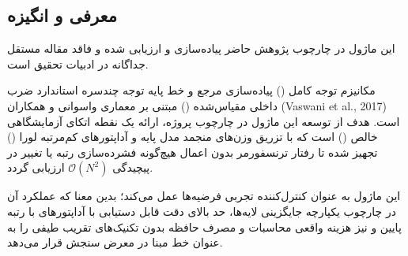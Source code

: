 \subsection{معرفی و انگیزه}
این ماژول در چارچوب پژوهش حاضر پیاده‌سازی و ارزیابی شده و فاقد مقاله مستقل جداگانه در ادبیات تحقیق است.

مکانیزم توجه کامل () پیاده‌سازی مرجع و خط پایه توجه چندسره استاندارد ضرب داخلی مقیاس‌شده () مبتنی بر معماری واسوانی و همکاران (Vaswani et al., 2017) است. هدف از توسعه این ماژول در چارچوب پروژه، ارائه یک نقطه اتکای آزمایشگاهی خالص () است که با تزریق وزن‌های منجمد مدل پایه و آداپتورهای کم‌مرتبه لورا () تجهیز شده تا رفتار ترنسفورمر بدون اعمال هیچ‌گونه فشرده‌سازی رتبه یا تغییر در پیچیدگی $\mathcal{O}(N^2)$ ارزیابی گردد.

این ماژول به عنوان کنترل‌کننده تجربی فرضیه‌ها عمل می‌کند؛ بدین معنا که عملکرد آن در چارچوب یکپارچه جایگزینی لایه‌ها، حد بالای دقت قابل دستیابی با آداپتورهای با رتبه پایین و نیز هزینه واقعی محاسبات و مصرف حافظه بدون تکنیک‌های تقریب طیفی را به عنوان خط مبنا در معرض سنجش قرار می‌دهد.
